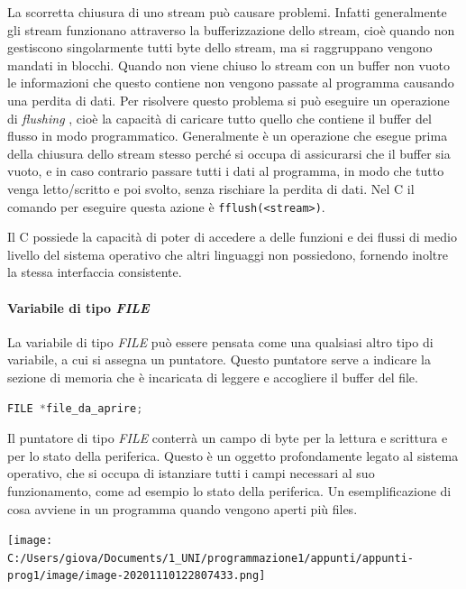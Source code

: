 \documentclass[
  paper=a4,
  oneside  ,captions=tableheading
]{scrbook}
\newcommand{\passthrough}[1]{#1}
\begin{document}
La scorretta chiusura di uno stream può causare problemi. Infatti
generalmente gli stream funzionano attraverso la bufferizzazione dello
stream, cioè quando non gestiscono singolarmente tutti byte dello
stream, ma si raggruppano vengono mandati in blocchi. Quando non viene
chiuso lo stream con un buffer non vuoto le informazioni che questo
contiene non vengono passate al programma causando una perdita di dati.
Per risolvere questo problema si può eseguire un operazione di
\emph{flushing} , cioè la capacità di caricare tutto quello che contiene
il buffer del flusso in modo programmatico. Generalmente è un operazione
che esegue prima della chiusura dello stream stesso perché si occupa di
assicurarsi che il buffer sia vuoto, e in caso contrario passare tutti i
dati al programma, in modo che tutto venga letto/scritto e poi svolto,
senza rischiare la perdita di dati. Nel C il comando per eseguire questa
azione è \passthrough{\lstinline!fflush(<stream>)!}.

Il C possiede la capacità di poter di accedere a delle funzioni e dei
flussi di medio livello del sistema operativo che altri linguaggi non
possiedono, fornendo inoltre la stessa interfaccia consistente.

\hypertarget{variabile-di-tipo-file}{%
\paragraph{\texorpdfstring{Variabile di tipo
\emph{FILE}}{Variabile di tipo FILE}}\label{variabile-di-tipo-file}}

La variabile di tipo \emph{FILE} può essere pensata come una qualsiasi
altro tipo di variabile, a cui si assegna un puntatore. Questo puntatore
serve a indicare la sezione di memoria che è incaricata di leggere e
accogliere il buffer del file.

\begin{lstlisting}[language=C]
FILE *file_da_aprire;
\end{lstlisting}

Il puntatore di tipo \emph{FILE} conterrà un campo di byte per la
lettura e scrittura e per lo stato della periferica. Questo è un oggetto
profondamente legato al sistema operativo, che si occupa di istanziare
tutti i campi necessari al suo funzionamento, come ad esempio lo stato
della periferica. Un esemplificazione di cosa avviene in un programma
quando vengono aperti più files.

\texttt{[image: C:/Users/giova/Documents/1\_UNI/programmazione1/appunti/appunti-prog1/image/image-20201110122807433.png]}
\end{document}

